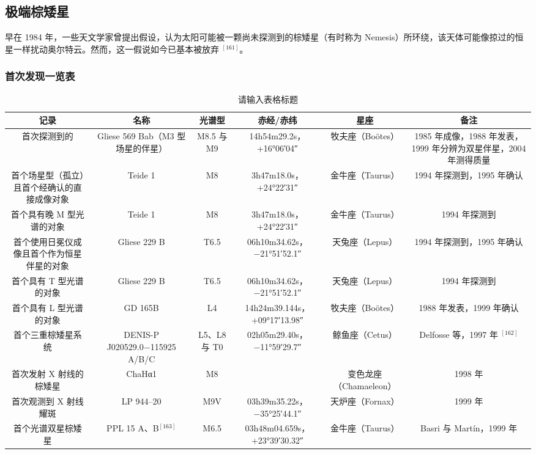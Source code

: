 \subsection{极端棕矮星}
早在 1984 年，一些天文学家曾提出假设，认为太阳可能被一颗尚未探测到的棕矮星（有时称为 Nemesis）所环绕，该天体可能像掠过的恒星一样扰动奥尔特云。然而，这一假说如今已基本被放弃 $^{[161]}$。
\subsubsection{首次发现一览表}
\begin{table}[ht]
\centering
\caption{请输入表格标题}\label{tab_Brdw1}
\begin{tabular}{|c|c|c|c|c|c|}
\hline
\textbf{记录}& \textbf{名称} & \textbf{光谱型} & \textbf{赤经/赤纬} & \textbf{星座} & \textbf{备注} \\
\hline
首次探测到的 & Gliese 569 Bab（M3 型场星的伴星）& M8.5 与 M9& 14h54m29.2s，+16°06′04″ & 牧夫座（Boötes）& 1985 年成像，1988 年发表，1999 年分辨为双星伴星，2004 年测得质量\\
\hline 
首个场星型（孤立）且首个经确认的直接成像对象 & Teide 1 & M8 & 3h47m18.0s，+24°22′31″& 金牛座（Taurus）& 1994 年探测到，1995 年确认\\
\hline
首个具有晚 M 型光谱的对象 & Teide 1 & M8 & 3h47m18.0s，+24°22′31″ & 金牛座（Taurus） & 1994 年探测到\\
\hline
首个使用日冕仪成像且首个作为恒星伴星的对象 & Gliese 229 B & T6.5 & 06h10m34.62s，−21°51′52.1″ & 天兔座（Lepus） & 1994 年探测到，1995 年确认\\
\hline
首个具有 T 型光谱的对象 & Gliese 229 B & T6.5 & 06h10m34.62s，−21°51′52.1″ & 天兔座（Lepus） & 1994 年探测到\\
\hline
首个具有 L 型光谱的对象 & GD 165B & L4 & 14h24m39.144s，+09°17′13.98″ & 牧夫座（Boötes） & 1988 年发表，1999 年确认\\
\hline
首个三重棕矮星系统 & DENIS-P J020529.0−115925 A/B/C & L5、L8 与 T0 & 02h05m29.40s，−11°59′29.7″ & 鲸鱼座（Cetus） & Delfosse 等，1997 年 $^{[162]}$\\
\hline
首次发射 X 射线的棕矮星 & ChaHα1 & M8 & &变色龙座（Chamaeleon）&1998 年\\
\hline
首次观测到 X 射线耀斑 & LP 944–20 & M9V & 03h39m35.22s，−35°25′44.1″ & 天炉座（Fornax）& 1999 年\\
\hline
首个光谱双星棕矮星 & PPL 15 A、B$^{[163]}$ & M6.5 & 03h48m04.659s，+23°39′30.32″ & 金牛座（Taurus）& Basri 与 Martín，1999 年\\
\hline

\end{tabular}
\end{table}

